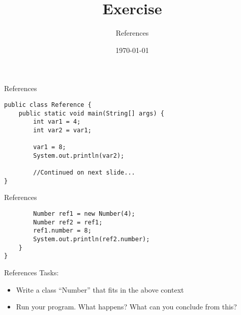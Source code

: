 


\title{Exercise}
\subtitle{References}
\date{\today}




\begin{frame}
    \titlepage
\end{frame}

\begin{frame}{References}
   \begin{lstlisting}
public class Reference {
    public static void main(String[] args) {
        int var1 = 4;
        int var2 = var1;

        var1 = 8;
        System.out.println(var2);
        
        //Continued on next slide...
}\end{lstlisting}
\end{frame}

\begin{frame}{References}
   \begin{lstlisting}
        Number ref1 = new Number(4);    
        Number ref2 = ref1;
        ref1.number = 8;
        System.out.println(ref2.number);
    }
}\end{lstlisting}
\end{frame}

\begin{frame}{References}
    Tasks:
    \begin{itemize}
        \item Write a class ``Number'' that fits in the above context
        \item Run your program. What happens? What can you conclude from this?
    \end{itemize}
\end{frame}



